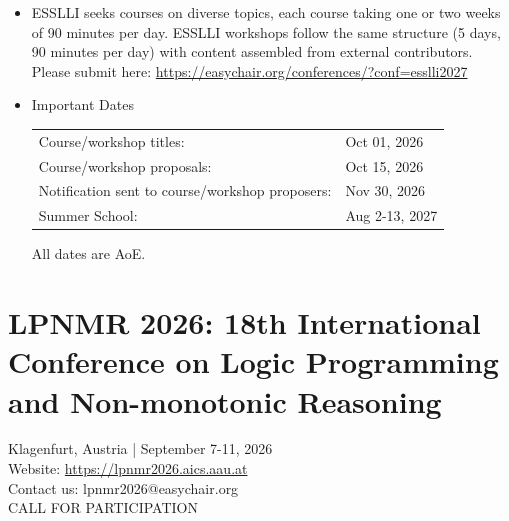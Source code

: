 \documentclass[prodmode,acmtecs]{acmsmall} %
\begin{document}
\begin{itemize}\item   ESSLLI seeks courses on diverse topics, each course taking one or two weeks of 90 minutes per day. ESSLLI workshops follow the same structure (5 days, 90 minutes per day) with content assembled from external contributors. Please submit here: \href{https://easychair.org/conferences/?conf=esslli2027}{https://easychair.org/conferences/?conf=esslli2027} 
 
\item  Important Dates 
 
\begin{tabulary}{\linewidth}{LL}Course/workshop titles:  & Oct 01, 2026 \\
Course/workshop proposals:  & Oct 15, 2026 \\
Notification sent to course/workshop proposers:  & Nov 30, 2026 \\
Summer School:  & Aug 2-13, 2027 \\
\end{tabulary}
 
  All dates are AoE.  
 
\end{itemize}\section{LPNMR 2026: 18th International Conference on Logic Programming and Non-monotonic Reasoning}\label{LPNMR2026}  Klagenfurt, Austria | September 7-11, 2026\\ 
  Website: \href{https://lpnmr2026.aics.aau.at}{https://lpnmr2026.aics.aau.at}\\ 
  Contact us: lpnmr2026@easychair.org\\ 
CALL FOR PARTICIPATION 
\end{document}
